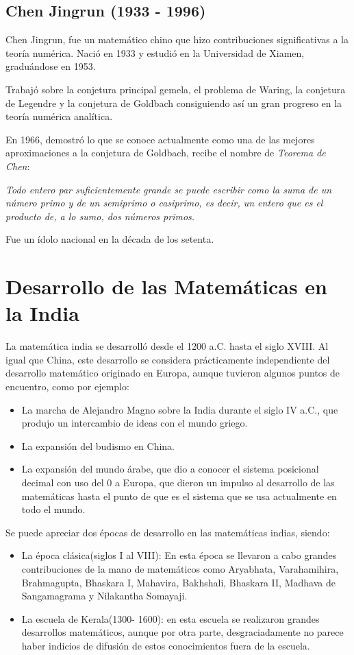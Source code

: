 \documentclass[a4paper, 11pt]{article}
\begin{document}
	\subsection{Chen Jingrun (1933 - 1996)}
		Chen Jingrun, fue un matemático chino que hizo contribuciones significativas a la teoría numérica. Nació en 1933
		y estudió en la Universidad de Xiamen, graduándose en 1953.
		
		Trabajó sobre la conjetura principal gemela, el problema de Waring, la conjetura de Legendre y la conjetura de
		Goldbach consiguiendo así un gran progreso en la teoría numérica analítica.
		
		En 1966, demostró lo que se conoce actualmente como una de las mejores aproximaciones a la conjetura de Goldbach,
		recibe el nombre de \textit{Teorema de Chen}:
		
		\begin{center}
			\em
			Todo entero par suficientemente grande se puede escribir como la suma de un número primo y de un semiprimo
			o casiprimo, es decir, un entero que es el producto de, a lo sumo, dos números primos.
		\end{center} 
		
		Fue un ídolo nacional en la década de los setenta.
				
\section{Desarrollo de las Matemáticas en la India}
	La matemática india se desarrolló desde el 1200 a.C. hasta el siglo XVIII. Al igual que China, este desarrollo se
	considera prácticamente independiente del desarrollo matemático originado en Europa, aunque tuvieron algunos
	puntos de encuentro, como por ejemplo:
	\begin{itemize}
		\item La marcha de Alejandro Magno sobre la India durante el siglo IV a.C., que produjo un intercambio de ideas
		con el mundo griego.
		\item La expansión del budismo en China.
		\item La expansión del mundo árabe, que dio a conocer el sistema posicional decimal con uso del 0 a Europa, que
		dieron un impulso al desarrollo de las matemáticas hasta el punto de que es el sistema que se usa actualmente
		en todo el mundo.
	\end{itemize}	

	Se puede apreciar dos épocas de desarrollo en las matemáticas indias, siendo:
	\begin{itemize}
		\item La época clásica(siglos I al VIII): En esta época se llevaron a cabo grandes contribuciones de la mano de
		matemáticos como Aryabhata, Varahamihira, Brahmagupta, Bhaskara I, Mahavira, Bakhshali, Bhaskara II, Madhava de
		Sangamagrama y Nilakantha Somayaji.
		\item La escuela de Kerala(1300- 1600): en esta escuela se realizaron grandes desarrollos matemáticos, aunque
		por otra parte, desgraciadamente no parece haber indicios de difusión de estos conocimientos fuera de la escuela.
	\end{itemize}
\end{document}
